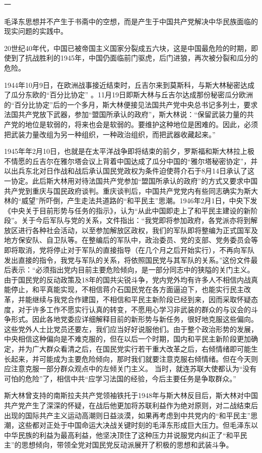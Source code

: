 \documentclass[UTF8, 12pt, a4paper]{ctexrep}
\begin{document}
一

毛泽东思想并不产生于书斋中的空想，而是产生于中国共产党解决中华民族面临的现实问题的实践中。

20世纪40年代，中国已被帝国主义国家分裂成五六块，这是中国最危险的时期，即使到了抗战胜利的1945年，中国仍面临前门驱虎，后门进狼，再次被分裂和瓜分的危险。

1944年10月9日，在欧洲战事接近结束时，丘吉尔来到莫斯科，与斯大林秘密达成了瓜分东欧的“百分比协定” 。11月19日即斯大林与丘吉尔达成那份秘密瓜分欧洲的“百分比协定”后的一个多月，斯大林便接见法国共产党中央总书记多列士，要求法国共产党放下武器，参加“盟国所承认的政府”，斯大林说：“保留武装力量的共产党的地位是软弱的，将来也会是软弱的。要维护这种地位是困难的。因此，必须把武装力量改组为另一种组织，一种政治组织，而把武器收藏起来。”

1945年年2月10日，也就是在太平洋战争即将结束的前夕，罗斯福和斯大林拉上极不情愿的丘吉尔在雅尔塔会议上背着中国达成了瓜分中国的“雅尔塔秘密协定”，并以出兵东北对日作战和战后承认国民党政权为条件迫使蒋介石于8月14日承认了这一协定。此后斯大林用对待法国共产党参加“盟国所承认的政府”的方式又要求中国共产党到重庆与国民政府谈判。重庆谈判后，中国共产党党内有些同志确实为斯大林的“威望”所吓倒，产生走法共道路的“和平民主”思潮。1946年2月1日，中央下发《中央关于目前形势与任务的指示》，认为“从此中国即走上了和平民主建设的新阶段”。关于今后军队与党的关系，文件指出：“我党即将参加政府，各党派亦将到解放区进行各种社会活动，以至参加解放区政权，我们的军队即将整编为正式国军及地方保安队、自卫队等。在整编后的军队中，政治委员、党的支部、党务委员会等即将取消，党将停止对于军队的直接指导（在几个月之后开始实行），不再向军队发出直接的指令，我党与军队的关系，将依照国民党与其军队的关系。”这份文件最后表示：“必须指出党内目前主要危险倾向，是一部分同志中的狭隘的关门主义。由于国民党的反动政策及18年的国共尖锐斗争，党内党外均有许多人不相信内战真能停止，和平真能实现，不相信蒋介石国民党在各方面逼迫下，也能实行民主改革，并能继续与我党合作建国，不相信和平民主新阶段已经到来，因而采取怀疑态度，对于许多工作不愿实行认真的转变，不愿用心学习非武装的群众的与议会的斗争形式。因此各地党委应详细解释目前的新形势与新任务，很好地克服这些偏向。这些党外人士比党员还要左，我们应当好好说服他们。由于整个政治形势的发展，中央相信这种偏向是不难克服的，但在以后一个时期，国内和平民主新阶段更加确定，并为广大群众看清之后，在国民党实行若干重大改革之后，右倾情绪即可能生长起来，并可能成为主要危险倾向，那时我们就要注意克服右倾情绪。但在今天则应注意克服一部分群众观点中的左倾关门主义。 当时，就连苏联大使都认为“没有可怕的危险”了，相信中共“应学习法国的经验，今后主要任务是争取群众。”

斯大林曾支持的南斯拉夫共产党领袖铁托于1948年与斯大林反目后，斯大林对中国共产党产生了深深的怀疑，在战后他更加将苏联利益作为绝对原则，对二战结束后出现的国际共产主义运动高潮则日益淡漠，如果再考虑到中共党内的“和平民主”思潮，这些都对正处于中国命运大决战关键时刻的毛泽东形成巨大压力。但毛泽东以中华民族的利益为最高利益，他坚决顶住了这种压力并说服党内纠正了“和平民主”的思想倾向，带领全党对国民党反动派展开了积极的思想和武装斗争。
\end{document}
